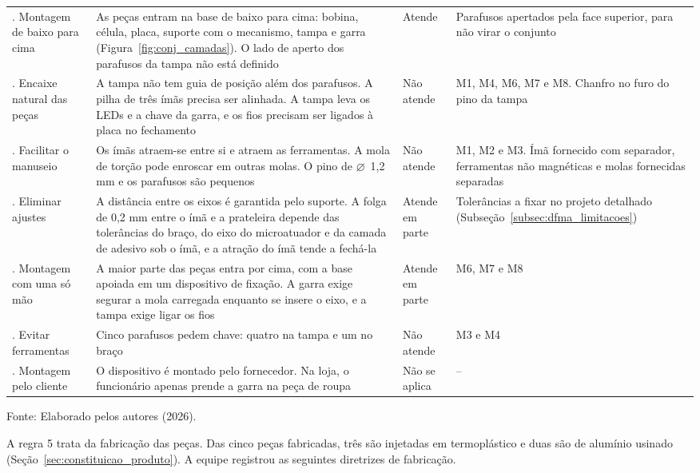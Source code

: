 \begin{longtable}{@{}
    >{\RaggedRight\arraybackslash}p{2.7cm}
    >{\RaggedRight\arraybackslash}p{6.2cm}
    >{\RaggedRight\arraybackslash}p{1.7cm}
    >{\RaggedRight\arraybackslash}p{4.1cm}@{}}
    7. Montagem de baixo para cima & As peças entram na base de baixo para cima: bobina, célula, placa, suporte com o mecanismo, tampa e garra (Figura~\ref{fig:conj_camadas}). O lado de aperto dos parafusos da tampa não está definido & Atende & Parafusos apertados pela face superior, para não virar o conjunto \\
    8. Encaixe natural das peças & A tampa não tem guia de posição além dos parafusos. A pilha de três ímãs precisa ser alinhada. A tampa leva os LEDs e a chave da garra, e os fios precisam ser ligados à placa no fechamento & Não atende & M1, M4, M6, M7 e M8. Chanfro no furo do pino da tampa \\
    9. Facilitar o manuseio & Os ímãs atraem-se entre si e atraem as ferramentas. A mola de torção pode enroscar em outras molas. O pino de $\varnothing$~1,2 mm e os parafusos são pequenos & Não atende & M1, M2 e M3. Ímã fornecido com separador, ferramentas não magnéticas e molas fornecidas separadas \\
    10. Eliminar ajustes & A distância entre os eixos é garantida pelo suporte. A folga de 0,2 mm entre o ímã e a prateleira depende das tolerâncias do braço, do eixo do microatuador e da camada de adesivo sob o ímã, e a atração do ímã tende a fechá-la & Atende em parte & Tolerâncias a fixar no projeto detalhado (Subseção~\ref{subsec:dfma_limitacoes}) \\
    11. Montagem com uma só mão & A maior parte das peças entra por cima, com a base apoiada em um dispositivo de fixação. A garra exige segurar a mola carregada enquanto se insere o eixo, e a tampa exige ligar os fios & Atende em parte & M6, M7 e M8 \\
    12. Evitar ferramentas & Cinco parafusos pedem chave: quatro na tampa e um no braço & Não atende & M3 e M4 \\
    13. Montagem pelo cliente & O dispositivo é montado pelo fornecedor. Na loja, o funcionário apenas prende a garra na peça de roupa & Não se aplica & -- \\
\end{longtable}
\endgroup
\begin{center}
    \footnotesize Fonte: Elaborado pelos autores (2026).
\end{center}

A regra 5 trata da fabricação das peças. Das cinco peças fabricadas, três são injetadas em termoplástico e duas são de alumínio usinado (Seção~\ref{sec:constituicao_produto}). A equipe registrou as seguintes diretrizes de fabricação.

